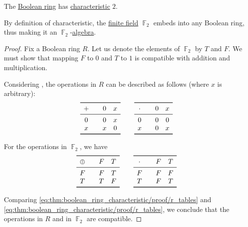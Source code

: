\begin{proposition}\label{thm:boolean_ring_characteristic}
  The \hyperref[def:boolean_ring]{Boolean ring} has \hyperref[def:ring_characteristic]{characteristic} \( 2 \).
\end{proposition}
\begin{comments}
  \item By definition of characteristic, the \hyperref[def:finite_field]{finite field} \( \BbbF_2 \) embeds into any Boolean ring, thus making it an \( \BbbF_2 \)-\hyperref[def:algebra_over_ring]{algebra}.
\end{comments}
\begin{proof}
  Fix a Boolean ring \( R \). Let us denote the elements of \( \BbbF_2 \) by \( T \) and \( F \). We must show that mapping \( F \) to \( 0 \) and \( T \) to \( 1 \) is compatible with addition and multiplication.

  Considering , the operations in \( R \) can be described as follows (where \( x \) is arbitrary):
  \begin{equation}\label{eq:thm:boolean_ring_characteristic/proof/r_tables}
    \begin{array}{c !{\quad} cc}
      \toprule
      + & 0 & x \\
      \midrule
      0 & 0 & x \\
      x & x & 0 \\
      \bottomrule
    \end{array}
    \qquad
    \begin{array}{c !{\quad} cc}
      \toprule
      \cdot & 0 & x \\
      \midrule
      0     & 0 & 0 \\
      x     & 0 & x \\
      \bottomrule
    \end{array}
  \end{equation}

  For the operations in \( \BbbF_2 \), we have
  \begin{equation}\label{eq:thm:boolean_ring_characteristic/proof/f2_tables}
    \begin{array}{c !{\quad} cc}
      \toprule
      \oplus & F & T \\
      \midrule
      F      & F & T \\
      T      & T & F \\
      \bottomrule
    \end{array}
    \qquad
    \begin{array}{c !{\quad} cc}
      \toprule
      \cdot & F & T \\
      \midrule
      F     & F & F \\
      T     & F & T \\
      \bottomrule
    \end{array}
  \end{equation}

  Comparing \eqref{eq:thm:boolean_ring_characteristic/proof/r_tables} and \eqref{eq:thm:boolean_ring_characteristic/proof/r_tables}, we conclude that the operations in \( R \) and in \( \BbbF_2 \) are compatible.
\end{proof}

